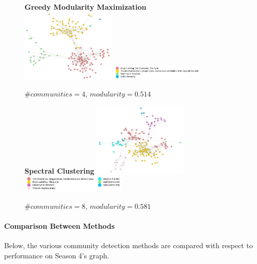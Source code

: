 \documentclass[10pt,twocolumn,letterpaper]{article}
\begin{document}
\begin{figure}[!h]
    \centering
    \textbf{Greedy Modularity Maximization}\\
    \includegraphics[width=0.4\textwidth]{img/s4/communities_gmm.jpg}
    \includegraphics[width=0.4\textwidth]{img/s4/gmm_legend.jpg}\\
    \caption{\small{$\#communities=4$, $modularity=0.514$}}
    \label{fig:gmm_s4}
\end{figure}

\begin{figure}[!h]
    \centering
    \textbf{Spectral Clustering}
    \includegraphics[width=0.4\textwidth]{img/s4/communities_sc.jpg}
    \includegraphics[width=0.45\textwidth]{img/s4/sc_legend.jpg}\\
    \caption{\small{$\#communities=8$, $modularity=0.581$}}
    \label{fig:sc_s4}
    \vspace{6cm}
\end{figure}

\newpage

\paragraph{Comparison Between Methods}

Below, the various community detection methods are compared with respect to performance on Season 4's graph.
\end{document}
